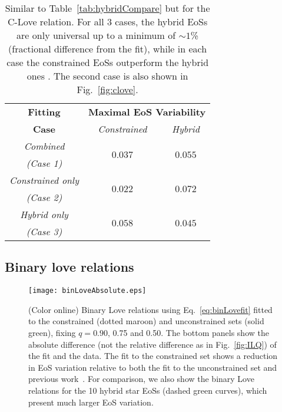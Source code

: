 \documentclass[prd,twocolumn,nofootinbib,superscriptaddress,amsmath,amssymb]{revtex4-1}
\begin{document}
\begin{table}
\centering
\begin{tabular}{ c  || c c } 
 \hline
 \hline
 \textbf{Fitting} & \multicolumn{2}{c}{\textbf{Maximal EoS Variability}} \\
 \cline{2-3}
 \textbf{Case} &  \multicolumn{1}{c|}{\emph{Constrained}} & \emph{Hybrid}\\
 \hline
 \emph{Combined} &  \multirow{2}{*}{$0.037$} & \multirow{2}{*}{$0.055$}\\
 \emph{(Case 1)} & &\\
 \cline{1-1}
 \emph{Constrained only} & \multirow{2}{*}{$0.022$} & \multirow{2}{*}{$0.072$}\\
  \emph{(Case 2)} & &\\
  \cline{1-1}
 \emph{Hybrid only} & \multirow{2}{*}{$0.058$} & \multirow{2}{*}{$0.045$}\\
  \emph{(Case 3)} & &\\
  \cline{1-1}
\hline
\hline
\end{tabular}
\caption{
Similar to Table~\ref{tab:hybridCompare} but for the C-Love relation.
For all 3 cases, the hybrid EoSs are only universal up to a minimum of $\sim1$\% (fractional difference from the fit), while in each case the constrained EoSs outperform the hybrid ones . The second case is also shown in Fig.~\ref{fig:clove}.
}\label{tab:hybridCompareClove}
\end{table}


\subsection{Binary love relations}
\label{sec:binary}

\begin{figure}[htb]
\begin{center} 
\texttt{[image: binLoveAbsolute.eps]}
\end{center}
\caption{(Color online) Binary Love relations using Eq.~\eqref{eq:binLovefit} fitted to the constrained (dotted maroon) and unconstrained sets (solid green), fixing $q=0.90$, 0.75 and 0.50. The bottom panels show the absolute difference (not the relative difference as in Fig.~\ref{fig:ILQ}) of the fit and the data. The fit to the constrained set shows a reduction in EoS variation relative to both the fit to the unconstrained set and previous work~\cite{Yagi:binLove}. For comparison, we also show the binary Love relations for the 10 hybrid star EoSs (dashed green curves), which present much larger EoS variation. 
}
\label{fig:binLove}
\end{figure} 
\end{document}
